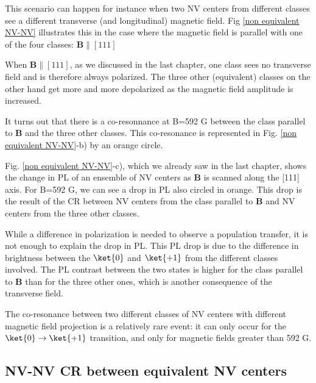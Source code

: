 \documentclass[a4paper,11pt]{report}
\begin{document}
This scenario can happen for instance when two NV centers from different classes see a different transverse (and longitudinal) magnetic field. Fig \ref{non equivalent NV-NV} illustrates this in the case where the magnetic field is parallel with one of the four classes: $\mathbf{B} \parallel [111]$

When $\mathbf{B} \parallel [111]$, as we discussed in the last chapter, one class sees no transverse field and is therefore always polarized. The three other (equivalent) classes on the other hand get more and more depolarized as the magnetic field amplitude is increased. 

It turns out that there is a co-resonnance at B=592 G between the class parallel to $\mathbf{B}$ and the three other classes. This co-resonance is represented in Fig. \ref{non equivalent NV-NV}-b) by an orange circle.

Fig. \ref{non equivalent NV-NV}-c), which we already saw in the last chapter, shows the change in PL of an ensemble of NV centers as $\mathbf{B}$ is scanned along the [111] axis. For B=592 G, we can see a drop in PL also circled in orange. This drop is the result of the CR between NV centers from the class parallel to $\mathbf{B}$ and NV centers from the three other classes. 

While a difference in polarization is needed to observe a population transfer, it is not enough to explain the drop in PL. This PL drop is due to the difference in brightness between the $\ket{0}$ and $\ket{+1}$ from the different classes involved. The PL contrast between the two states is higher for the class parallel to $\mathbf{B}$ than for the three other ones, which is another consequence of the transverse field.

The co-resonance between two different classes of NV centers with different magnetic field projection is a relatively rare event: it can only occur for the $\ket{0} \to \ket{+1}$ transition, and only for magnetic fields greater than 592 G.


\subsection{NV-NV CR between equivalent NV centers}
\end{document}
